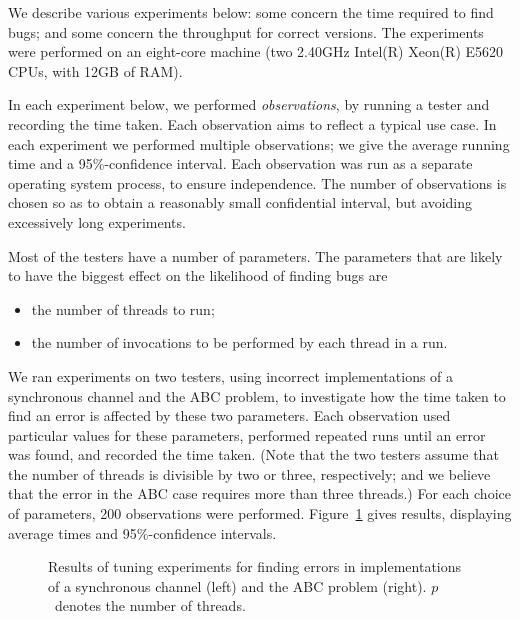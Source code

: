 We describe various experiments below: some concern the time required to find
bugs; and some concern the throughput for correct versions.
%
The experiments were performed on an eight-core machine (two 2.40GHz Intel(R)
Xeon(R) E5620 CPUs, with 12GB of RAM).

In each experiment below, we performed \emph{observations}, by running a
tester and recording the time taken.  Each observation aims to reflect a
typical use case.  In each experiment we performed multiple observations; we
give the average running time and a 95\%-confidence interval.  Each
observation was run as a separate operating system process, to ensure
independence.  The number of observations is chosen so as to obtain a
reasonably small confidential interval, but avoiding excessively long
experiments.



Most of the testers have a number of parameters.  The parameters that are
likely to have the biggest effect on the likelihood of finding bugs are
%
\begin{itemize}
\item the number of threads to run;
\item the number of invocations to be performed by each thread in a run.
\end{itemize}
%
We ran experiments on two testers, using incorrect implementations of a
synchronous channel and the ABC problem, to investigate how the time taken to
find an error is affected by these two parameters.  Each observation used
particular values for these parameters, performed repeated runs until an error
was found, and recorded the time taken.  (Note that the two testers assume
that the number of threads is divisible by two or three, respectively; and we
believe that the error in the ABC case requires more than three threads.)  For
each choice of parameters, 200 observations were performed.
Figure~\ref{fig:tuning} gives results, displaying average times and
95\%-confidence intervals.


\begin{figure}
\begin{minipage}{0.5\textwidth}

\end{minipage}
%
\begin{minipage}{0.5\textwidth}

\end{minipage}%
\caption{Results of tuning experiments for finding errors in implementations
  of a synchronous channel (left) and the ABC problem (right).  $p$~denotes
  the number of threads.  \label{fig:tuning}}
\end{figure}

